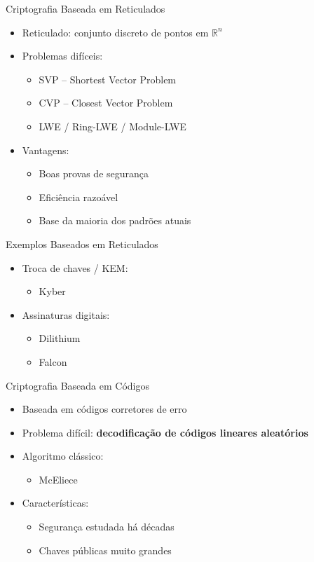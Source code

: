 \documentclass[aspectratio=169]{beamer}
\begin{document}
	\begin{frame}{Criptografia Baseada em Reticulados}
		\begin{itemize}
			\item Reticulado: conjunto discreto de pontos em \(\mathbb{R}^n\)
			\item Problemas difíceis:
			\begin{itemize}
				\item SVP – Shortest Vector Problem
				\item CVP – Closest Vector Problem
				\item LWE / Ring-LWE / Module-LWE
			\end{itemize}
			\item Vantagens:
			\begin{itemize}
				\item Boas provas de segurança
				\item Eficiência razoável
				\item Base da maioria dos padrões atuais
			\end{itemize}
		\end{itemize}
	\end{frame}
	
	\begin{frame}{Exemplos Baseados em Reticulados}
		\begin{itemize}
			\item Troca de chaves / KEM:
			\begin{itemize}
				\item Kyber
			\end{itemize}
			\item Assinaturas digitais:
			\begin{itemize}
				\item Dilithium
				\item Falcon
			\end{itemize}
		\end{itemize}
	\end{frame}
	
	\begin{frame}{Criptografia Baseada em Códigos}
		\begin{itemize}
			\item Baseada em códigos corretores de erro
			\item Problema difícil: \textbf{decodificação de códigos lineares aleatórios}
			\item Algoritmo clássico:
			\begin{itemize}
				\item McEliece
			\end{itemize}
			\item Características:
			\begin{itemize}
				\item Segurança estudada há décadas
				\item Chaves públicas muito grandes
			\end{itemize}
		\end{itemize}
	\end{frame}
	
\end{document}
